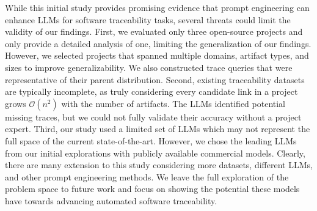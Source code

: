 While this initial study provides promising evidence that prompt engineering can enhance LLMs for software traceability tasks, several threats could limit the validity of our findings. First, we evaluated only three open-source projects and only provide a detailed analysis of one, limiting the generalization of our findings. However, we selected projects that spanned multiple domains, artifact types, and sizes to improve generalizability. We also constructed trace queries that were representative of their parent distribution. Second, existing traceability datasets are typically incomplete, as truly considering every candidate link in a project grows $\mathcal{O}(n^2)$ with the number of artifacts. The LLMs identified potential missing traces, but we could not fully validate their accuracy without a project expert. Third, our study used a limited set of LLMs which may not represent the full space of the current state-of-the-art. However, we chose the leading LLMs from our initial explorations with publicly available commercial models. Clearly, there are many extension to this study considering more datasets, different LLMs, and other prompt engineering methods. We leave the full exploration of the problem space to future work and focus on showing the potential these models have towards advancing automated software traceability.